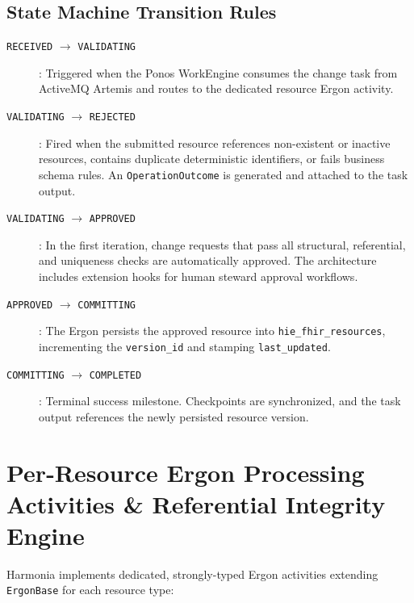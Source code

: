 \subsection{State Machine Transition Rules}
\begin{description}
    \item[\texttt{RECEIVED} $\rightarrow$ \texttt{VALIDATING}]: Triggered when the Ponos WorkEngine consumes the change task from ActiveMQ Artemis and routes to the dedicated resource Ergon activity.
    \item[\texttt{VALIDATING} $\rightarrow$ \texttt{REJECTED}]: Fired when the submitted resource references non-existent or inactive resources, contains duplicate deterministic identifiers, or fails business schema rules. An \texttt{OperationOutcome} is generated and attached to the task output.
    \item[\texttt{VALIDATING} $\rightarrow$ \texttt{APPROVED}]: In the first iteration, change requests that pass all structural, referential, and uniqueness checks are automatically approved. The architecture includes extension hooks for human steward approval workflows.
    \item[\texttt{APPROVED} $\rightarrow$ \texttt{COMMITTING}]: The Ergon persists the approved resource into \texttt{hie\_fhir\_resources}, incrementing the \texttt{version\_id} and stamping \texttt{last\_updated}.
    \item[\texttt{COMMITTING} $\rightarrow$ \texttt{COMPLETED}]: Terminal success milestone. Checkpoints are synchronized, and the task output references the newly persisted resource version.
\end{description}

\section{Per-Resource Ergon Processing Activities \& Referential Integrity Engine}
\label{sec:pr_erga_reference}

Harmonia implements dedicated, strongly-typed Ergon activities extending \texttt{ErgonBase} for each resource type:

